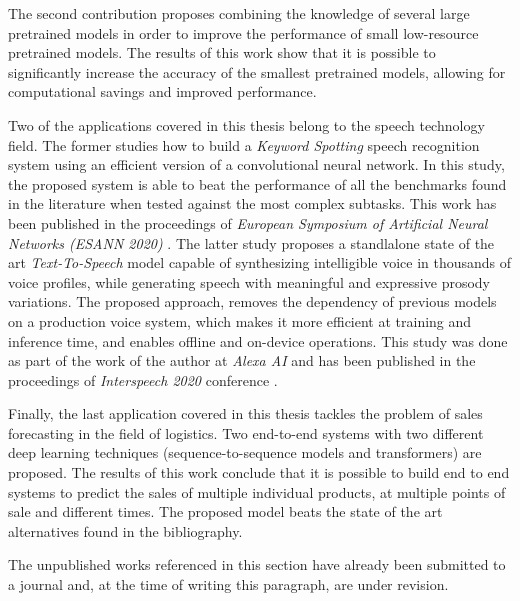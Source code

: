 The second contribution proposes combining the knowledge of several large pretrained models in order to improve the performance of small low-resource pretrained models. The results of this work show that it is possible to significantly increase the accuracy of the smallest pretrained models, allowing for computational savings and improved performance.

Two of the applications covered in this thesis belong to the speech technology field. The former studies how to build a \textit{Keyword Spotting} speech recognition system using an efficient version of a convolutional neural network. In this study, the proposed system is able to beat the performance of all the benchmarks found in the literature when tested against the most complex subtasks. This work has been published in the proceedings of \textit{European Symposium of Artificial Neural Networks (ESANN 2020)} \autocite{valles2021a}. The latter study proposes a standlalone state of the art \textit{Text-To-Speech} model capable of synthesizing intelligible voice in thousands of voice profiles, while generating speech with meaningful and expressive prosody variations. The proposed approach, removes the dependency of previous models on a production voice system, which makes it more efficient at training and inference time, and enables offline and on-device operations. This study was done as part of the work of the author at \textit{Alexa AI} and has been published in the proceedings of \textit{Interspeech 2020} conference \autocite{valles2021b}.

Finally, the last application covered in this thesis tackles the problem of sales forecasting in the field of logistics. Two end-to-end systems with two different deep learning techniques (sequence-to-sequence models and transformers) are proposed. The results of this work conclude that it is possible to build end to end systems to predict the sales of multiple individual products, at multiple points of sale and different times. The proposed model beats the state of the art alternatives found in the bibliography.

The unpublished works referenced in this section have already been submitted to a journal and, at the time of writing this paragraph, are under revision.

